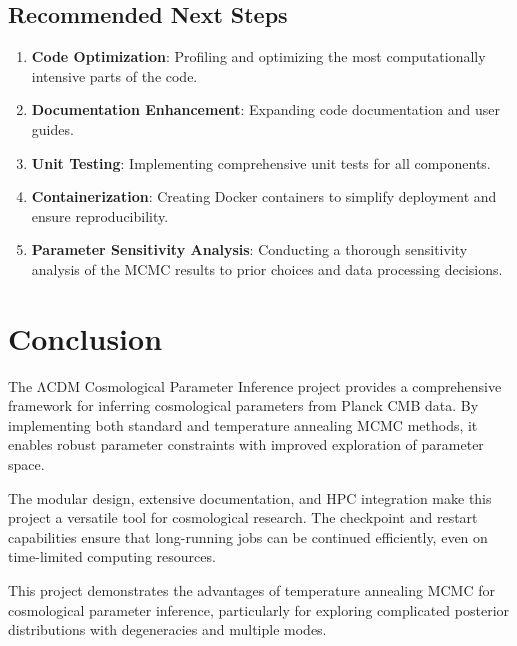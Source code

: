 \documentclass[11pt]{article}
\begin{document}
\subsection{Recommended Next Steps}

\begin{enumerate}
    \item \textbf{Code Optimization}: Profiling and optimizing the most computationally intensive parts of the code.
    
    \item \textbf{Documentation Enhancement}: Expanding code documentation and user guides.
    
    \item \textbf{Unit Testing}: Implementing comprehensive unit tests for all components.
    
    \item \textbf{Containerization}: Creating Docker containers to simplify deployment and ensure reproducibility.
    
    \item \textbf{Parameter Sensitivity Analysis}: Conducting a thorough sensitivity analysis of the MCMC results to prior choices and data processing decisions.
\end{enumerate}

\section{Conclusion}

The ΛCDM Cosmological Parameter Inference project provides a comprehensive framework for inferring cosmological parameters from Planck CMB data. By implementing both standard and temperature annealing MCMC methods, it enables robust parameter constraints with improved exploration of parameter space.

The modular design, extensive documentation, and HPC integration make this project a versatile tool for cosmological research. The checkpoint and restart capabilities ensure that long-running jobs can be continued efficiently, even on time-limited computing resources.

This project demonstrates the advantages of temperature annealing MCMC for cosmological parameter inference, particularly for exploring complicated posterior distributions with degeneracies and multiple modes.
\end{document}
